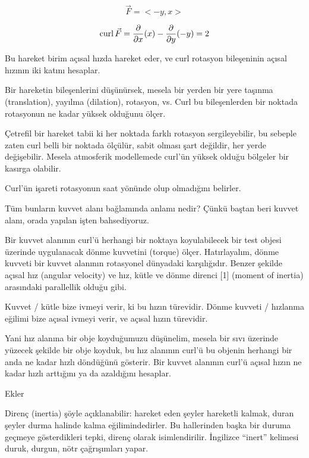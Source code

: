 \documentclass[12pt,fleqn]{article}\usepackage{../../common}
\begin{document}
$$ \vec{F} = < -y,x > $$

$$
\operatorname{curl} \vec{F} =
\frac{\partial }{\partial x}(x) -
\frac{\partial }{\partial y}(-y) = 2
$$

Bu hareket birim açısal hızda hareket eder, ve curl rotasyon bileşeninin açısal
hızının iki katını hesaplar.

Bir hareketin bileşenlerini düşünürsek, mesela bir yerden bir yere taşınma
(translation), yayılma (dilation), rotasyon, vs. Curl bu bileşenlerden bir
noktada rotasyonun ne kadar yüksek olduğunu ölçer.

Çetrefil bir hareket tabii ki her noktada farklı rotasyon sergileyebilir, bu
sebeple zaten curl belli bir noktada ölçülür, sabit olması şart değildir, her
yerde değişebilir. Mesela atmosferik modellemede curl'ün yüksek olduğu bölgeler
bir kasırga olabilir.

Curl'ün işareti rotasyonun saat yönünde olup olmadığını belirler. 

Tüm bunların kuvvet alanı bağlamında anlamı nedir? Çünkü baştan beri kuvvet
alanı, orada yapılan işten bahsediyoruz.

Bir kuvvet alanının curl'ü herhangi bir noktaya koyulabilecek bir test objesi
üzerinde uygulanacak dönme kuvvetini (torque) ölçer. Hatırlayalım, dönme kuvveti
bir kuvvet alanının rotasyonel dünyadaki karşılığıdır. Benzer şekilde açısal hız
(angular velocity) ve hız, kütle ve dönme direnci [1] (moment of inertia)
arasındaki parallellik olduğu gibi.

Kuvvet / kütle bize ivmeyi verir, ki bu hızın türevidir. Dönme kuvveti /
hızlanma eğilimi bize açısal ivmeyi verir, ve açısal hızın türevidir.

Yani hız alanına bir obje koyduğumuzu düşünelim, mesela bir sıvı üzerinde
yüzecek şekilde bir obje koyduk, bu hız alanının curl'ü bu objenin herhangi bir
anda ne kadar hızlı döndüğünü gösterir. Bir kuvvet alanının curl'ü açısal hızın
ne kadar hızlı arttığını ya da azaldığını hesaplar.

Ekler

Direnç (inertia) şöyle açıklanabilir: hareket eden şeyler hareketli kalmak,
duran şeyler durma halinde kalma eğilimindedirler. Bu hallerinden başka bir
duruma geçmeye gösterdikleri tepki, direnç olarak isimlendirilir. İngilizce
``inert'' kelimesi duruk, durgun, nötr çağrışımları yapar.
\end{document}
